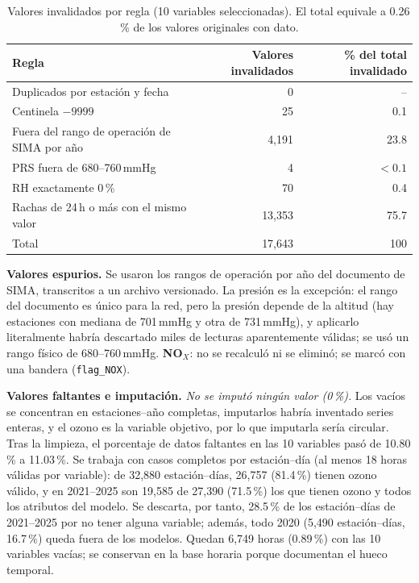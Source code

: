 \documentclass[11pt,letterpaper]{article}
\begin{document}
\begin{table}[h]
\centering
\small
\begin{tabular}{@{}lrr@{}}
\toprule
Regla & Valores invalidados & \% del total invalidado \\
\midrule
Duplicados por estaci\'on y fecha & 0 & -- \\
Centinela $-9999$ & 25 & 0.1 \\
Fuera del rango de operaci\'on de SIMA por a\~no & 4,191 & 23.8 \\
PRS fuera de 680--760\,mmHg & 4 & $<0.1$ \\
RH exactamente 0\,\% & 70 & 0.4 \\
Rachas de 24\,h o m\'as con el mismo valor & 13,353 & 75.7 \\
\midrule
Total & 17,643 & 100 \\
\bottomrule
\end{tabular}
\caption{Valores invalidados por regla (10 variables seleccionadas). El total equivale a 0.26\,\% de los valores originales con dato.}
\label{tab:limpieza}
\end{table}

\textbf{Valores espurios.} Se usaron los rangos de operaci\'on por a\~no del documento de SIMA, transcritos a un archivo versionado. La presi\'on es la excepci\'on: el rango del documento es \'unico para la red, pero la presi\'on depende de la altitud (hay estaciones con mediana de 701\,mmHg y otra de 731\,mmHg), y aplicarlo literalmente habr\'ia descartado miles de lecturas aparentemente v\'alidas; se us\'o un rango f\'isico de 680--760\,mmHg. \textbf{NO$_X$}: no se recalcul\'o ni se elimin\'o; se marc\'o con una bandera (\texttt{flag\_NOX}).

\textbf{Valores faltantes e imputaci\'on.} \emph{No se imput\'o ning\'un valor (0\,\%).} Los vac\'ios se concentran en estaciones--a\~no completas, imputarlos habr\'ia inventado series enteras, y el ozono es la variable objetivo, por lo que imputarla ser\'ia circular. Tras la limpieza, el porcentaje de datos faltantes en las 10 variables pas\'o de 10.80\,\% a 11.03\,\%. Se trabaja con casos completos por estaci\'on--d\'ia (al menos 18 horas v\'alidas por variable): de 32,880 estaci\'on--d\'ias, 26,757 (81.4\,\%) tienen ozono v\'alido, y en 2021--2025 son 19,585 de 27,390 (71.5\,\%) los que tienen ozono y todos los atributos del modelo. Se descarta, por tanto, 28.5\,\% de los estaci\'on--d\'ias de 2021--2025 por no tener alguna variable; adem\'as, todo 2020 (5,490 estaci\'on--d\'ias, 16.7\,\%) queda fuera de los modelos. Quedan 6,749 horas (0.89\,\%) con las 10 variables vac\'ias; se conservan en la base horaria porque documentan el hueco temporal.
\end{document}
